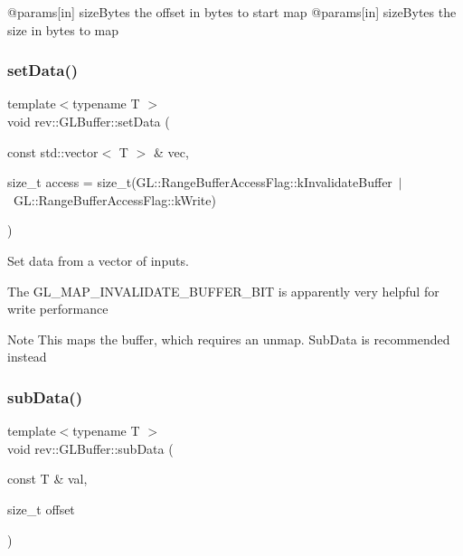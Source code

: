 @params\mbox{[}in\mbox{]} size\+Bytes the offset in bytes to start map @params\mbox{[}in\mbox{]} size\+Bytes the size in bytes to map \mbox{\label{classrev_1_1_g_l_buffer_a1b72e5c274dbe688738533bad385d176}} 
\subsubsection{\texorpdfstring{setData()}{setData()}}
{\footnotesize\ttfamily template$<$typename T $>$ \\
void rev\+::\+G\+L\+Buffer\+::set\+Data (\begin{DoxyParamCaption}\item[{const std\+::vector$<$ T $>$ \&}]{vec,  }\item[{size\+\_\+t}]{access = {\ttfamily size\+\_\+t(GL\+:\+:RangeBufferAccessFlag\+:\+:kInvalidateBuffer~$\vert$~GL\+:\+:RangeBufferAccessFlag\+:\+:kWrite)} }\end{DoxyParamCaption})\hspace{0.3cm}{\ttfamily [inline]}}



Set data from a vector of inputs. 

The G\+L\+\_\+\+M\+A\+P\+\_\+\+I\+N\+V\+A\+L\+I\+D\+A\+T\+E\+\_\+\+B\+U\+F\+F\+E\+R\+\_\+\+B\+IT is apparently very helpful for write performance \begin{DoxyNote}{Note}
This maps the buffer, which requires an unmap. Sub\+Data is recommended instead 
\end{DoxyNote}
\mbox{\label{classrev_1_1_g_l_buffer_a92d217358a53b80cf8b2ed9385f30faf}} 
\subsubsection{\texorpdfstring{subData()}{subData()}}
{\footnotesize\ttfamily template$<$typename T $>$ \\
void rev\+::\+G\+L\+Buffer\+::sub\+Data (\begin{DoxyParamCaption}\item[{const T \&}]{val,  }\item[{size\+\_\+t}]{offset }\end{DoxyParamCaption})\hspace{0.3cm}{\ttfamily [inline]}}



